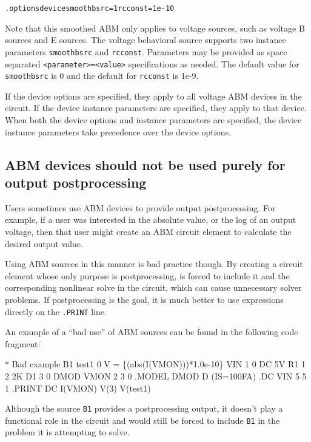      
\begin{alltt} .options device  smoothbsrc=1 rcconst = 1e-10 \end{alltt}

Note that this smoothed ABM only applies to voltage sources, such as voltage
B sources and E sources. The voltage behavioral source supports two instance
parameters \texttt{smoothbsrc} and \texttt{rcconst}. Parameters may be provided
as space  separated \texttt{<parameter>=<value>} specifications as needed. The
default value for \texttt{smoothbsrc} is 0 and the default for \texttt{rcconst}
is 1e-9.

If the device options are specified, they apply to all voltage ABM devices in
the circuit. If the device instance parameters are specified, they apply to that
device. When both the device options and instance parameters are specified, the
device instance parameters take precedence over the device options.


\subsection{ABM devices should not be used purely for output postprocessing}

Users sometimes use ABM devices to provide output postprocessing. For
example, if a user was interested in the absolute value, or the log of
an output voltage, then that user might create an ABM circuit element to
calculate the desired output value.

Using ABM sources in this manner is bad practice though. By creating a
circuit element whose only purpose is postprocessing, \Xyce{} is forced
to include it and the corresponding nonlinear solve in the circuit,
which can cause unnecessary solver problems. If postprocessing is the
goal, it is much better to use expressions directly on the
\verb|.PRINT| line.

An example of a ``bad use'' of ABM sources can be found in the
following code fragment:

\begin{vquote}
\color{blue}* Bad example
\color{XyceRed}B1 test1 0 V = \{(abs(I(VMON)))*1.0e-10\} \color{black}
VIN 1 0 DC 5V
R1 1 2 2K
D1 3 0 DMOD
VMON 2 3 0
.MODEL DMOD D (IS=100FA)
.DC VIN 5 5 1
.PRINT DC I(VMON) V(3) V(test1)
\end{vquote}

Although the source \texttt{B1} provides a 
postprocessing output, it doesn't play a functional role in the 
circuit and \Xyce{} would still be forced to include \texttt{B1} in 
the problem it is attempting to solve.  

